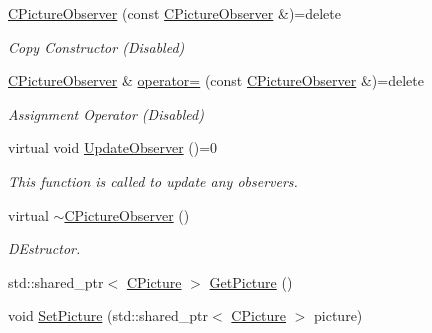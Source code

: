 \begin{DoxyCompactItemize}
\item 
\hypertarget{class_c_picture_observer_a7c0cae97a7c165b98a00aeb2892cd6e7}{\hyperlink{class_c_picture_observer_a7c0cae97a7c165b98a00aeb2892cd6e7}{C\+Picture\+Observer} (const \hyperlink{class_c_picture_observer}{C\+Picture\+Observer} \&)=delete}\label{class_c_picture_observer_a7c0cae97a7c165b98a00aeb2892cd6e7}

\begin{DoxyCompactList}\small\item\em Copy Constructor (Disabled) \end{DoxyCompactList}\item 
\hypertarget{class_c_picture_observer_a200c66fe9ab13e18e9559033165b1895}{\hyperlink{class_c_picture_observer}{C\+Picture\+Observer} \& \hyperlink{class_c_picture_observer_a200c66fe9ab13e18e9559033165b1895}{operator=} (const \hyperlink{class_c_picture_observer}{C\+Picture\+Observer} \&)=delete}\label{class_c_picture_observer_a200c66fe9ab13e18e9559033165b1895}

\begin{DoxyCompactList}\small\item\em Assignment Operator (Disabled) \end{DoxyCompactList}\item 
\hypertarget{class_c_picture_observer_a0dce27216a8cb8a2490f0efc83a5994a}{virtual void \hyperlink{class_c_picture_observer_a0dce27216a8cb8a2490f0efc83a5994a}{Update\+Observer} ()=0}\label{class_c_picture_observer_a0dce27216a8cb8a2490f0efc83a5994a}

\begin{DoxyCompactList}\small\item\em This function is called to update any observers. \end{DoxyCompactList}\item 
virtual \hyperlink{class_c_picture_observer_a86036f6ad66ae4bad3f204f61d234f46}{$\sim$\+C\+Picture\+Observer} ()
\begin{DoxyCompactList}\small\item\em D\+Estructor. \end{DoxyCompactList}\item 
std\+::shared\+\_\+ptr$<$ \hyperlink{class_c_picture}{C\+Picture} $>$ \hyperlink{class_c_picture_observer_ab7613c4badd101ace6a992b2eaaea153}{Get\+Picture} ()
\item 
void \hyperlink{class_c_picture_observer_a8f4bd1a0d4e3b14b511d572a6dadeb7e}{Set\+Picture} (std\+::shared\+\_\+ptr$<$ \hyperlink{class_c_picture}{C\+Picture} $>$ picture)
\end{DoxyCompactItemize}
